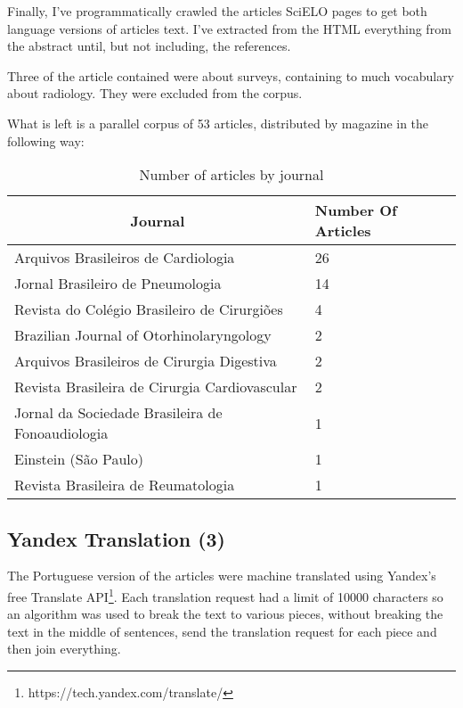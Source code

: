 Finally, I've programmatically crawled the articles SciELO pages to get both language versions of articles text. I've extracted from the HTML everything from the abstract until, but not including, the references.

Three of the article contained were about surveys, containing to much vocabulary about radiology. They were excluded from the corpus.

What is left is a parallel corpus of 53 articles, distributed by magazine in the following way:

\begin{table}[h]
\centering
\caption{Number of articles by journal}
\label{table:articles_by_journal}
\begin{tabular}{@{}ll@{}}
\toprule
\multicolumn{1}{c}{\textbf{Journal}}                 & \textbf{Number Of Articles} \\ \midrule
Arquivos Brasileiros de Cardiologia         & 26                          \\
Jornal Brasileiro de Pneumologia            & 14                          \\
Revista do Colégio Brasileiro de Cirurgiões & 4                           \\
Brazilian Journal of Otorhinolaryngology    & 2                           \\
Arquivos Brasileiros de Cirurgia Digestiva  & 2                           \\
Revista Brasileira de Cirurgia Cardiovascular        & 2                           \\
Jornal da Sociedade Brasileira de Fonoaudiologia     & 1                           \\
Einstein (São Paulo)                                 & 1                           \\
Revista Brasileira de Reumatologia                   & 1                           \\ \bottomrule
\end{tabular}
\end{table}

\subsection{Yandex Translation (3)}

The Portuguese version of the articles were machine translated using Yandex's free Translate API\footnote{https://tech.yandex.com/translate/}. Each translation request had a limit of 10000 characters so an algorithm was used to break the text to various pieces, without breaking the text in the middle of sentences, send the translation request for each piece and then join everything.

